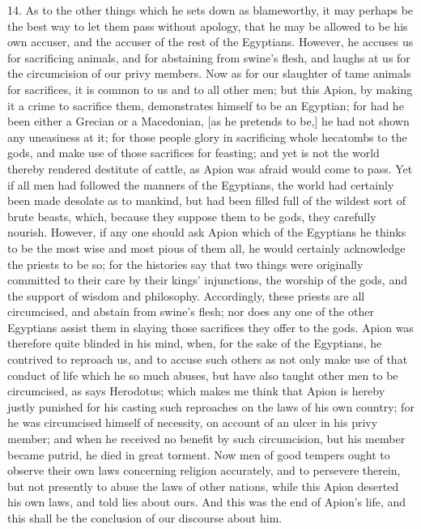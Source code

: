 14. As to the other things which he sets down as blameworthy, it may
perhaps be the best way to let them pass without apology, that he may be
allowed to be his own accuser, and the accuser of the rest of the
Egyptians. However, he accuses us for sacrificing animals, and for
abstaining from swine's flesh, and laughs at us for the circumcision of
our privy members. Now as for our slaughter of tame animals for
sacrifices, it is common to us and to all other men; but this Apion, by
making it a crime to sacrifice them, demonstrates himself to be an
Egyptian; for had he been either a Grecian or a Macedonian, [as he
pretends to be,] he had not shown any uneasiness at it; for those people
glory in sacrificing whole hecatombs to the gods, and make use of those
sacrifices for feasting; and yet is not the world thereby rendered
destitute of cattle, as Apion was afraid would come to pass. Yet if all
men had followed the manners of the Egyptians, the world had certainly
been made desolate as to mankind, but had been filled full of the wildest
sort of brute beasts, which, because they suppose them to be gods, they
carefully nourish. However, if any one should ask Apion which of the
Egyptians he thinks to be the most wise and most pious of them all, he
would certainly acknowledge the priests to be so; for the histories say
that two things were originally committed to their care by their kings'
injunctions, the worship of the gods, and the support of wisdom and
philosophy. Accordingly, these priests are all circumcised, and abstain
from swine's flesh; nor does any one of the other Egyptians assist them in
slaying those sacrifices they offer to the gods. Apion was therefore quite
blinded in his mind, when, for the sake of the Egyptians, he contrived to
reproach us, and to accuse such others as not only make use of that
conduct of life which he so much abuses, but have also taught other men to
be circumcised, as says Herodotus; which makes me think that Apion is
hereby justly punished for his casting such reproaches on the laws of his
own country; for he was circumcised himself of necessity, on account of an
ulcer in his privy member; and when he received no benefit by such
circumcision, but his member became putrid, he died in great torment. Now
men of good tempers ought to observe their own laws concerning religion
accurately, and to persevere therein, but not presently to abuse the laws
of other nations, while this Apion deserted his own laws, and told lies
about ours. And this was the end of Apion's life, and this shall be the
conclusion of our discourse about him.

